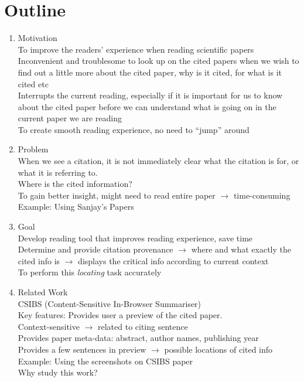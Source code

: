 \documentclass[12 pt]{article}
\begin{document}
\section*{Outline}
\begin{enumerate}
\item Motivation\\
To improve the readers' experience when reading scientific papers\\
Inconvenient and troublesome to look up on the cited papers when we wish to find out a little more about the cited paper, why is it cited, for what is it cited etc\\
Interrupts the current reading, especially if it is important for us to know about the cited paper before we can understand what is going on in the current paper we are reading\\
To create smooth reading experience, no need to ``jump'' around
\item Problem\\
When we see a citation, it is not immediately clear what the citation is for, or what it is referring to.\\
Where is the cited information?\\
To gain better insight, might need to read entire paper $\rightarrow$ time-consuming\\
Example: Using Sanjay's Papers
\item Goal\\
Develop reading tool that improves reading experience, save time\\
Determine and provide citation provenance $\rightarrow$ where and what exactly the cited info is $\rightarrow$ displays the critical info according to current context\\
To perform this \textit{locating} task accurately
\item Related Work\\
CSIBS (Content-Sensitive In-Browser Summariser)\\
Key features: Provides user a preview of the cited paper.\\
Context-sensitive $\rightarrow$ related to citing sentence\\
Provides paper meta-data: abstract, author names, publishing year\\
Provides a few sentences in preview $\rightarrow$ possible locations of cited info\\
Example: Using the screenshots on CSIBS paper\\
Why study this work?\\

\end{enumerate}
\end{document}

